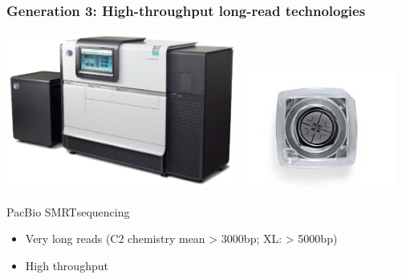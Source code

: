 \documentclass[serif,11pt]{beamer}
\newcommand{\R}{\textsuperscript{\textregistered}}
\begin{document}
\begin{frame}
\frametitle{Generation 3: High-throughput long-read technologies}
\label{sec-2-4}

   \includegraphics[width=3in]{img/RS.pdf}
   \includegraphics[width=2in]{img/smrtcell.jpeg}

   PacBio SMRT\R sequencing
\begin{itemize}
\item Very long reads (C2 chemistry mean > 3000bp; XL: > 5000bp)
\item High throughput
\end{itemize}
\end{frame}
\end{document}
